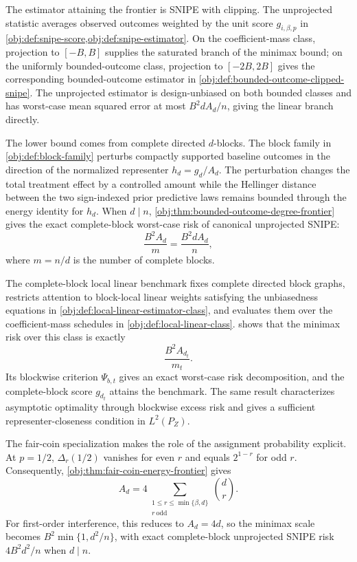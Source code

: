 \documentclass[11pt]{article}
\begin{document}
The estimator attaining the frontier is SNIPE with clipping. The unprojected statistic averages observed outcomes weighted by the unit score \(g_{i,\beta,p}\) in \cref{obj:def:snipe-score,obj:def:snipe-estimator}. On the coefficient-mass class, projection to \([-B,B]\) supplies the saturated branch of the minimax bound; on the uniformly bounded-outcome class, projection to \([-2B,2B]\) gives the corresponding bounded-outcome estimator in \cref{obj:def:bounded-outcome-clipped-snipe}. The unprojected estimator is design-unbiased on both bounded classes and has worst-case mean squared error at most \(B^2dA_d/n\), giving the linear branch directly.

The lower bound comes from complete directed \(d\)-blocks. The block family in \cref{obj:def:block-family} perturbs compactly supported baseline outcomes in the direction of the normalized representer \(h_d=g_d/A_d\). The perturbation changes the total treatment effect by a controlled amount while the Hellinger distance between the two sign-indexed prior predictive laws remains bounded through the energy identity for \(h_d\). When \(d\mid n\), \cref{obj:thm:bounded-outcome-degree-frontier} gives the exact complete-block worst-case risk of canonical unprojected SNIPE:
\[
\frac{B^2A_d}{m}
=
\frac{B^2dA_d}{n},
\]
where \(m=n/d\) is the number of complete blocks.

The complete-block local linear benchmark fixes complete directed block graphs, restricts attention to block-local linear weights satisfying the unbiasedness equations in \cref{obj:def:local-linear-estimator-class}, and evaluates them over the coefficient-mass schedules in \cref{obj:def:local-linear-class}.  shows that the minimax risk over this class is exactly
\[
\frac{B^2A_{d_t}}{m_t}.
\]
Its blockwise criterion \(\Psi_{b,t}\) gives an exact worst-case risk decomposition, and the complete-block score \(g_{d_t}\) attains the benchmark. The same result characterizes asymptotic optimality through blockwise excess risk and gives a sufficient representer-closeness condition in \(L^2(P_Z)\).

The fair-coin specialization makes the role of the assignment probability explicit. At \(p=1/2\), \(\Delta_r(1/2)\) vanishes for even \(r\) and equals \(2^{1-r}\) for odd \(r\). Consequently, \cref{obj:thm:fair-coin-energy-frontier} gives
\[
A_d
=
4\sum_{\substack{1\le r\le \min\{\beta,d\}\\ r\ \mathrm{odd}}}\binom dr .
\]
For first-order interference, this reduces to \(A_d=4d\), so the minimax scale becomes \(B^2\min\{1,d^2/n\}\), with exact complete-block unprojected SNIPE risk \(4B^2d^2/n\) when \(d\mid n\).
\end{document}
